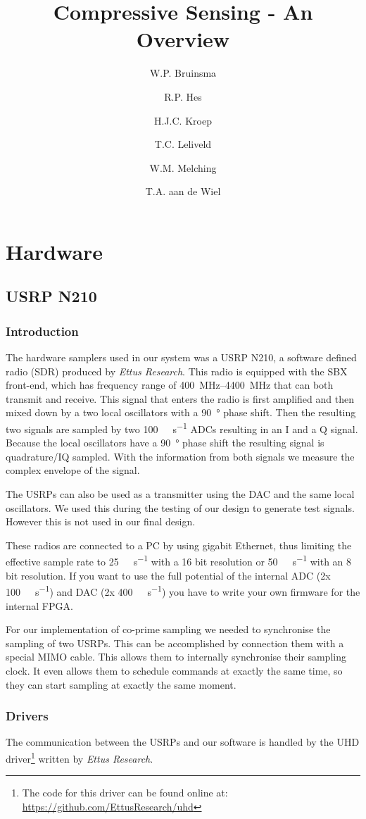 \documentclass[a4paper, openany, oneside]{memoir}
\title{Compressive Sensing - An Overview}
\author{W.P. Bruinsma \and R.P. Hes \and H.J.C. Kroep \and T.C. Leliveld \and W.M. Melching \and T.A. aan de Wiel}
\begin{document}
\chapter{Hardware}

\section{USRP N210}
\label{sec:usrp-n210}

\subsection{Introduction}
The hardware samplers used in our system was a USRP N210, a software defined radio (SDR) produced by \textit{Ettus Research}. This radio is equipped with the SBX front-end, which has frequency range of \SIrange{400}{4400}{\mega\hertz} that can both transmit and receive. This signal that enters the radio is first amplified and then mixed down by a two local oscillators with a \SI{90}{\degree} phase shift. Then the resulting two signals are sampled by two \SI{100}{\mega\sample\per\second} ADCs resulting in an I and a Q signal. Because the local oscillators have a \SI{90}{\degree} phase shift the resulting signal is quadrature/IQ sampled. With the information from both signals we measure the complex envelope of the signal.

The USRPs can also be used as a transmitter using the DAC and the same local oscillators. We used this during the testing of our design to generate test signals. However this is not used in our final design.

These radios are connected to a PC by using gigabit Ethernet, thus limiting the effective sample rate to \SI{25}{\mega\sample\per\second} with a 16 bit resolution or \SI{50}{\mega\sample\per\second} with an 8 bit resolution. If you want to use the full potential of the internal ADC (2x \SI{100}{\mega\sample\per\second}) and DAC (2x \SI{400}{\mega\sample\per\second}) you have to write your own firmware for the internal FPGA\@.

For our implementation of co-prime sampling we needed to synchronise the sampling of two USRPs. This can be accomplished by connection them with a special MIMO cable. This allows them to internally synchronise their sampling clock. It even allows them to schedule commands at exactly the same time, so they can start sampling at exactly the same moment.

\subsection{Drivers}
The communication between the USRPs and our software is handled by the UHD driver\footnote{The code for this driver can be found online at: \url{https://github.com/EttusResearch/uhd}} written by \textit{Ettus Research}.
\end{document}
